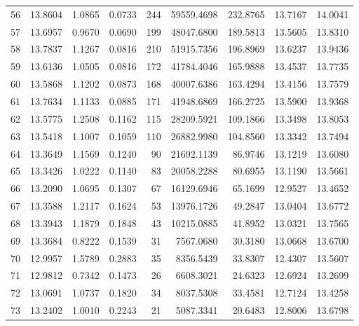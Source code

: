 \begin{longtable}{rrrrrrrrr}
56 & 13.8604 & 1.0865 & 0.0733 & 244 & 59559.4698 & 232.8765 & 13.7167 & 14.0041 \\
57 & 13.6957 & 0.9670 & 0.0690 & 199 & 48047.6800 & 189.5813 & 13.5605 & 13.8310 \\
58 & 13.7837 & 1.1267 & 0.0816 & 210 & 51915.7356 & 196.8969 & 13.6237 & 13.9436 \\
59 & 13.6136 & 1.0505 & 0.0816 & 172 & 41784.4046 & 165.9888 & 13.4537 & 13.7735 \\
60 & 13.5868 & 1.1202 & 0.0873 & 168 & 40007.6386 & 163.4294 & 13.4156 & 13.7579 \\
61 & 13.7634 & 1.1133 & 0.0885 & 171 & 41948.6869 & 166.2725 & 13.5900 & 13.9368 \\
62 & 13.5775 & 1.2508 & 0.1162 & 115 & 28209.5921 & 109.1866 & 13.3498 & 13.8053 \\
63 & 13.5418 & 1.1007 & 0.1059 & 110 & 26882.9980 & 104.8560 & 13.3342 & 13.7494 \\
64 & 13.3649 & 1.1569 & 0.1240 & 90 & 21692.1139 & 86.9746 & 13.1219 & 13.6080 \\
65 & 13.3426 & 1.0222 & 0.1140 & 83 & 20058.2288 & 80.6955 & 13.1190 & 13.5661 \\
66 & 13.2090 & 1.0695 & 0.1307 & 67 & 16129.6946 & 65.1699 & 12.9527 & 13.4652 \\
67 & 13.3588 & 1.2117 & 0.1624 & 53 & 13976.1726 & 49.2847 & 13.0404 & 13.6772 \\
68 & 13.3943 & 1.1879 & 0.1848 & 43 & 10215.0885 & 41.8952 & 13.0321 & 13.7565 \\
69 & 13.3684 & 0.8222 & 0.1539 & 31 & 7567.0680 & 30.3180 & 13.0668 & 13.6700 \\
70 & 12.9957 & 1.5789 & 0.2883 & 35 & 8356.5439 & 33.8307 & 12.4307 & 13.5607 \\
71 & 12.9812 & 0.7342 & 0.1473 & 26 & 6608.3021 & 24.6323 & 12.6924 & 13.2699 \\
72 & 13.0691 & 1.0737 & 0.1820 & 34 & 8037.5308 & 33.4581 & 12.7124 & 13.4258 \\
73 & 13.2402 & 1.0010 & 0.2243 & 21 & 5087.3341 & 20.6483 & 12.8006 & 13.6798 \\
\end{longtable}
